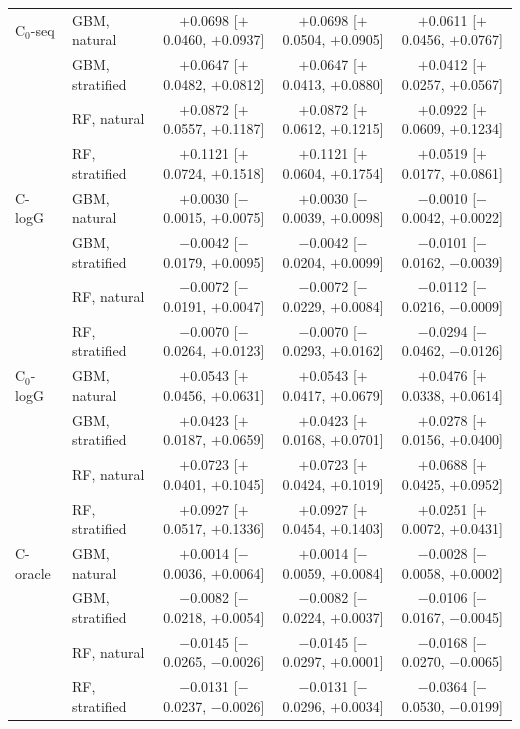 \begin{longtable}{llccc}
\addlinespace
C$_0$-seq & GBM, natural & $+$0.0698 [$+$0.0460, $+$0.0937] & $+$0.0698 [$+$0.0504, $+$0.0905] & $+$0.0611 [$+$0.0456, $+$0.0767] \\
 & GBM, stratified & $+$0.0647 [$+$0.0482, $+$0.0812] & $+$0.0647 [$+$0.0413, $+$0.0880] & $+$0.0412 [$+$0.0257, $+$0.0567] \\
 & RF, natural & $+$0.0872 [$+$0.0557, $+$0.1187] & $+$0.0872 [$+$0.0612, $+$0.1215] & $+$0.0922 [$+$0.0609, $+$0.1234] \\
 & RF, stratified & $+$0.1121 [$+$0.0724, $+$0.1518] & $+$0.1121 [$+$0.0604, $+$0.1754] & $+$0.0519 [$+$0.0177, $+$0.0861] \\
\addlinespace
C-logG & GBM, natural & $+$0.0030 [$-$0.0015, $+$0.0075] & $+$0.0030 [$-$0.0039, $+$0.0098] & $-$0.0010 [$-$0.0042, $+$0.0022] \\
 & GBM, stratified & $-$0.0042 [$-$0.0179, $+$0.0095] & $-$0.0042 [$-$0.0204, $+$0.0099] & $-$0.0101 [$-$0.0162, $-$0.0039] \\
 & RF, natural & $-$0.0072 [$-$0.0191, $+$0.0047] & $-$0.0072 [$-$0.0229, $+$0.0084] & $-$0.0112 [$-$0.0216, $-$0.0009] \\
 & RF, stratified & $-$0.0070 [$-$0.0264, $+$0.0123] & $-$0.0070 [$-$0.0293, $+$0.0162] & $-$0.0294 [$-$0.0462, $-$0.0126] \\
\addlinespace
C$_0$-logG & GBM, natural & $+$0.0543 [$+$0.0456, $+$0.0631] & $+$0.0543 [$+$0.0417, $+$0.0679] & $+$0.0476 [$+$0.0338, $+$0.0614] \\
 & GBM, stratified & $+$0.0423 [$+$0.0187, $+$0.0659] & $+$0.0423 [$+$0.0168, $+$0.0701] & $+$0.0278 [$+$0.0156, $+$0.0400] \\
 & RF, natural & $+$0.0723 [$+$0.0401, $+$0.1045] & $+$0.0723 [$+$0.0424, $+$0.1019] & $+$0.0688 [$+$0.0425, $+$0.0952] \\
 & RF, stratified & $+$0.0927 [$+$0.0517, $+$0.1336] & $+$0.0927 [$+$0.0454, $+$0.1403] & $+$0.0251 [$+$0.0072, $+$0.0431] \\
\addlinespace
C-oracle & GBM, natural & $+$0.0014 [$-$0.0036, $+$0.0064] & $+$0.0014 [$-$0.0059, $+$0.0084] & $-$0.0028 [$-$0.0058, $+$0.0002] \\
 & GBM, stratified & $-$0.0082 [$-$0.0218, $+$0.0054] & $-$0.0082 [$-$0.0224, $+$0.0037] & $-$0.0106 [$-$0.0167, $-$0.0045] \\
 & RF, natural & $-$0.0145 [$-$0.0265, $-$0.0026] & $-$0.0145 [$-$0.0297, $+$0.0001] & $-$0.0168 [$-$0.0270, $-$0.0065] \\
 & RF, stratified & $-$0.0131 [$-$0.0237, $-$0.0026] & $-$0.0131 [$-$0.0296, $+$0.0034] & $-$0.0364 [$-$0.0530, $-$0.0199] \\

\end{longtable}
